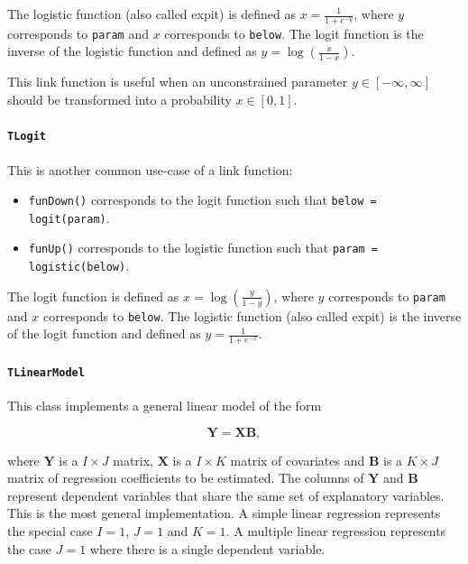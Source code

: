 \documentclass[a4paper,11pt]{article}
\def\B{\boldsymbol{B}}
\def\X{\boldsymbol{X}}
\def\Y{\boldsymbol{Y}}
\newcommand{\class}[1]{\texttt{#1}}
\newcommand{\privfunc}[1]{\texttt{\textunderscore#1()}}
\begin{document}
The logistic function (also called expit) is defined as $x = \frac{1}{1 + e^{-y}}$, where $y$ corresponds to \texttt{param} and $x$ corresponds to \texttt{below}. The logit function is the inverse of the logistic function and defined as $y = \log\left(\frac{x}{1-x}\right)$.

This link function is useful when an unconstrained parameter $y \in [-\infty, \infty]$ should be transformed into a probability $x \in [0, 1]$.

\paragraph{\class{TLogit}}

This is another common use-case of a link function:

\begin{itemize}
 \item \privfunc{funDown} corresponds to the logit function such that \texttt{below = logit(param)}.
  \item \privfunc{funUp} corresponds to the logistic function such that \texttt{param = logistic(below)}.
\end{itemize}

The logit function is defined as $x = \log\left(\frac{y}{1-y}\right)$, where $y$ corresponds to \texttt{param} and $x$ corresponds to \texttt{below}. The logistic function (also called expit) is the inverse of the logit function and defined as $y = \frac{1}{1 + e^{-x}}$.

\paragraph{\class{TLinearModel}}

This class implements a general linear model of the form

\begin{equation*}
 \Y = \X\B,
\end{equation*}

where $\Y$ is a $I \times J$ matrix, $\X$ is a $I \times K$ matrix of covariates and $\B$ is a $K \times J$ matrix of regression coefficients to be estimated. The columns of $\Y$ and $\B$ represent dependent variables that share the same set of explanatory variables. This is the most general implementation. A simple linear regression represents the special case $I=1$, $J=1$ and $K=1$. A multiple linear regression represents the case $J=1$ where there is a single dependent variable.
\end{document}
